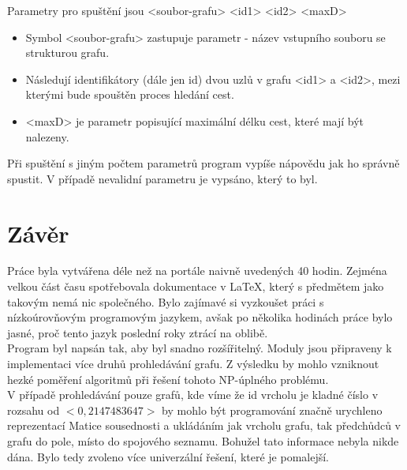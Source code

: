Parametry pro spuštění jsou <soubor-grafu> <id1> <id2> <maxD>
\begin{itemize}
	\item Symbol <soubor-grafu> zastupuje parametr - název vstupního souboru se strukturou grafu.
	\item Následují identifikátory (dále jen id) dvou uzlů v grafu <id1> a <id2>, mezi kterými bude spouštěn proces hledání cest.
	\item <maxD> je parametr popisující maximální délku cest, které mají být nalezeny.
\end{itemize}

Při spuštění s jiným počtem parametrů program vypíše nápovědu jak ho správně spustit. V případě nevalidní parametru je vypsáno, který to byl. 

\chapter{Závěr}
Práce byla vytvářena déle než na portále naivně uvedených 40 hodin. Zejména velkou část času spotřebovala dokumentace v \LaTeX, který s předmětem jako takovým nemá nic společného. Bylo zajímavé si vyzkoušet práci s nízkoúrovňovým programovým jazykem, avšak po několika hodinách práce bylo jasné, proč tento jazyk poslední roky ztrácí na oblibě.\\
Program byl napsán tak, aby byl snadno rozšířitelný. Moduly jsou připraveny k implementaci více druhů prohledávání grafu. Z výsledku by mohlo vzniknout hezké poměření algoritmů při řešení tohoto NP-úplného problému.\\
V případě prohledávání pouze grafů, kde víme že id vrcholu je kladné číslo v rozsahu od $<0,2147483647>$ by mohlo být programování značně urychleno reprezentací Matice sousednosti a ukládáním jak vrcholu grafu, tak předchůdců v grafu do pole, místo do spojového seznamu. Bohužel tato informace nebyla nikde dána. Bylo tedy zvoleno více univerzální řešení, které je pomalejší. 

